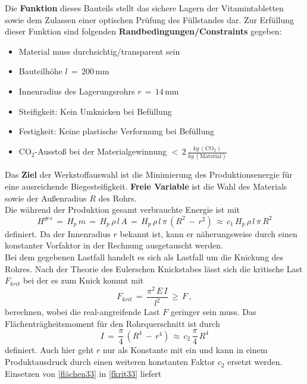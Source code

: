 Die \textbf{Funktion} dieses Bauteils stellt das sichere Lagern der Vitamintabletten sowie dem Zulassen einer optischen Prüfung des Füllstandes dar. Zur Erfüllung dieser Funktion sind folgenden \textbf{Randbedingungen/Constraints} gegeben:
\begin{itemize}
	\item Material muss durchsichtig/transparent sein
	\item Bauteilhöhe $l\,=\,200\,$mm
	\item Innenradius des Lagerungsrohrs $r\,=\,14\,$mm
	\item Steifigkeit: Kein Umknicken bei Befüllung
	\item Festigkeit: Keine plastische Verformung bei Befüllung
	\item CO$_2$-Ausstoß bei der Materialgewinnung $<\,2\,\frac{kg\,(\text{CO}_2)}{kg\,(\text{Material})}$
\end{itemize}
Das \textbf{Ziel} der Werkstoffauswahl ist die Minimierung des Produktionsenergie für eine ausreichende Biegesteifigkeit. \textbf{Freie Variable} ist die Wahl des Materials sowie der Außenradius $R$ des Rohrs.\\
Die während der Produktion gesamt verbrauchte Energie ist mit
\begin{equation}\label{energie33}
H^{ges}\,=\,H_p\,m\,=\,H_p\,\rho\,l\,A\,=\,H_p\,\rho\,l\,\pi\,\left(R^2\,-\,r^2\right)\,\approx\,c_1\,H_p\,\rho\,l\,\pi\,R^2
\end{equation}
definiert. Da der Innenradius $r$ bekannt ist, kann er näherungsweise durch einen konstanter Vorfaktor in der Rechnung ausgetauscht werden.\\
Bei dem gegebenen Lastfall handelt es sich als Lastfall um die Knickung des Rohres. Nach der Theorie des Eulerschen Knickstabes lässt sich die kritische Last $F_{krit}$ bei der es zum Knick kommt mit
\begin{equation}\label{fkrit33}
F_{krit}\,=\,\frac{\pi^2\,E\,I}{l^2}\,\ge\,F\,,
\end{equation}
berechnen, wobei die real-angreifende Last $F$ geringer sein muss.
Das Flächenträgheitsmoment für den Rohrquerschnitt ist durch
\begin{equation}\label{flächen33}
I\,=\,\frac{\pi}{4}\,\left(R^4\,-\,r^4\right)\,\approx\,c_2\,\frac{\pi}{4}\,R^4
\end{equation}
definiert. Auch hier geht $r$ nur als Konstante mit ein und kann in einem Produktausdruck durch einen weiteren konstanten Faktor $c_2$ ersetzt werden. Einsetzen von \ref{flächen33} in \ref{fkrit33} liefert
